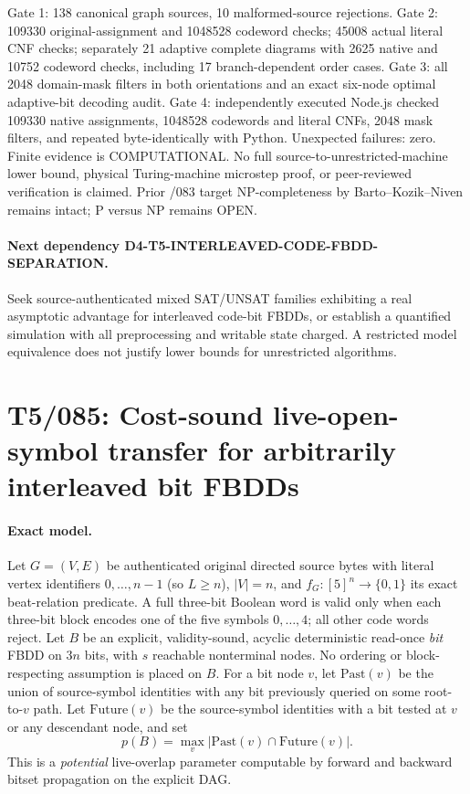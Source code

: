 \documentclass[11pt]{article}
\begin{document}
Gate 1: 138 canonical graph sources, 10 malformed-source
rejections. Gate 2: 109330 original-assignment and 1048528
codeword checks; 45008 actual literal CNF checks; separately
21 adaptive complete diagrams with 2625 native and 10752
codeword checks, including 17 branch-dependent order cases.
Gate 3: all 2048 domain-mask filters in both orientations
and an exact six-node optimal adaptive-bit decoding audit.
Gate 4: independently executed Node.js checked 109330 native
assignments, 1048528 codewords and literal CNFs, 2048 mask
filters, and repeated byte-identically with Python.
Unexpected failures: zero. Finite evidence is COMPUTATIONAL.
No full source-to-unrestricted-machine lower bound, physical
Turing-machine microstep proof, or peer-reviewed verification
is claimed. Prior /083 target NP-completeness by Barto--Kozik--Niven
remains intact; P versus NP remains OPEN.

\paragraph{Next dependency D4-T5-INTERLEAVED-CODE-FBDD-SEPARATION.}
Seek source-authenticated mixed SAT/UNSAT families exhibiting
a real asymptotic advantage for interleaved code-bit FBDDs,
or establish a quantified simulation with all preprocessing
and writable state charged. A restricted model equivalence
does not justify lower bounds for unrestricted algorithms.


\section{T5/085: Cost-sound live-open-symbol transfer for arbitrarily interleaved bit FBDDs}
\label{sec:t5live085}

\paragraph{Exact model.}
Let $G=(V,E)$ be authenticated original directed source bytes
with literal vertex identifiers $0,\ldots,n-1$ (so $L\ge n$),
$|V|=n$, and $f_G:[5]^n\to\{0,1\}$ its exact beat-relation predicate.
A full three-bit Boolean word is valid only when each three-bit block
encodes one of the five symbols $0,\ldots,4$; all other code words reject.
Let $B$ be an explicit, validity-sound, acyclic deterministic read-once
\emph{bit} FBDD on $3n$ bits, with $s$ reachable nonterminal nodes.
No ordering or block-respecting assumption is placed on $B$.
For a bit node $v$, let $\mathrm{Past}(v)$ be the union of source-symbol
identities with any bit previously queried on some root-to-$v$ path.
Let $\mathrm{Future}(v)$ be the source-symbol identities with a
bit tested at $v$ or any descendant node, and set
\[
 p(B)=\max_v|\mathrm{Past}(v)\cap\mathrm{Future}(v)|.
\]
This is a \emph{potential} live-overlap parameter computable by forward
and backward bitset propagation on the explicit DAG.
\end{document}
